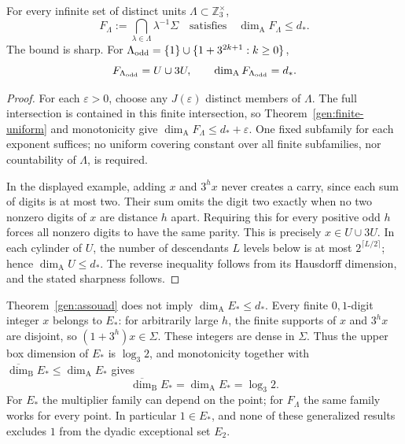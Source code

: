 \begin{theorem}\label{gen:assouad}
For every infinite set of distinct units
$\Lambda\subset\mathbb Z_3^\times$,
\[
 F_\Lambda:=\bigcap_{\lambda\in\Lambda}\lambda^{-1}\Sigma
       \quad\text{satisfies}\quad
 \dim_{\mathrm A}F_\Lambda\le d_*.
\]
The bound is sharp.  For
$\Lambda_{\rm odd}=\{1\}\cup\{1+3^{2k+1}:k\ge0\}$,
\[
 F_{\Lambda_{\rm odd}}=U\cup3U,
       \qquad\dim_{\mathrm A}F_{\Lambda_{\rm odd}}=d_*.
\]
\end{theorem}
\begin{proof}
For each $\varepsilon>0$, choose any $J(\varepsilon)$ distinct
members of $\Lambda$.  The full intersection is contained in
this finite intersection, so Theorem~\ref{gen:finite-uniform} and
monotonicity give $\dim_{\mathrm A}F_\Lambda\le d_*+\varepsilon$.
One fixed subfamily for each exponent suffices; no uniform covering
constant over all finite subfamilies, nor countability of $\Lambda$,
is required.

In the displayed example, adding $x$ and $3^h x$ never creates a
carry, since each sum of digits is at most two.  Their sum omits
the digit two exactly when no two nonzero digits of $x$ are distance
$h$ apart.  Requiring this for every positive odd $h$ forces all
nonzero digits to have the same parity.  This is precisely
$x\in U\cup3U$.  In each cylinder of $U$, the number of descendants
$L$ levels below is at most $2^{\lceil L/2\rceil}$; hence
$\dim_{\mathrm A}U\le d_*$.  The reverse inequality follows
from its Hausdorff dimension, and the stated sharpness follows.
\end{proof}

\begin{remark}\label{gen:scope}
Theorem~\ref{gen:assouad} does not imply
$\dim_{\mathrm A}E_*\le d_*$.  Every finite $0,1$-digit integer
$x$ belongs to $E_*$: for arbitrarily large $h$, the finite supports
of $x$ and $3^hx$ are disjoint, so $(1+3^h)x\in\Sigma$.
These integers are dense in $\Sigma$.  Thus the upper box dimension
of $E_*$ is $\log_3 2$, and monotonicity together with
$\overline{\dim}_{\mathrm B}E_*\le\dim_{\mathrm A}E_*$ gives
\[
 \overline{\dim}_{\mathrm B}E_*
      =\dim_{\mathrm A}E_*=\log_3 2.
\]
For $E_*$ the multiplier family can depend on the point; for
$F_\Lambda$ the same family works for every point.  In particular
$1\in E_*$, and none of these generalized results excludes
$1$ from the dyadic exceptional set $E_2$.
\end{remark}
